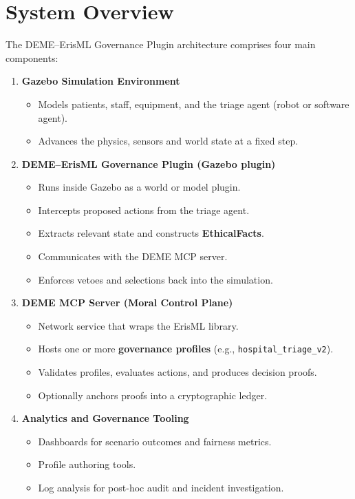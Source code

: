 \documentclass[11pt]{article}
\begin{document}
\section{System Overview}

The DEME--ErisML Governance Plugin architecture comprises four main components:

\begin{enumerate}
  \item \textbf{Gazebo Simulation Environment}
    \begin{itemize}
      \item Models patients, staff, equipment, and the triage agent (robot or software agent).
      \item Advances the physics, sensors and world state at a fixed step.
    \end{itemize}

  \item \textbf{DEME--ErisML Governance Plugin (Gazebo plugin)}
    \begin{itemize}
      \item Runs inside Gazebo as a world or model plugin.
      \item Intercepts proposed actions from the triage agent.
      \item Extracts relevant state and constructs \textbf{EthicalFacts}.
      \item Communicates with the DEME MCP server.
      \item Enforces vetoes and selections back into the simulation.
    \end{itemize}

  \item \textbf{DEME MCP Server (Moral Control Plane)}
    \begin{itemize}
      \item Network service that wraps the ErisML library.
      \item Hosts one or more \textbf{governance profiles} (e.g., \texttt{hospital\_triage\_v2}).
      \item Validates profiles, evaluates actions, and produces decision proofs.
      \item Optionally anchors proofs into a cryptographic ledger.
    \end{itemize}

  \item \textbf{Analytics and Governance Tooling}
    \begin{itemize}
      \item Dashboards for scenario outcomes and fairness metrics.
      \item Profile authoring tools.
      \item Log analysis for post-hoc audit and incident investigation.
    \end{itemize}
\end{enumerate}
\end{document}
